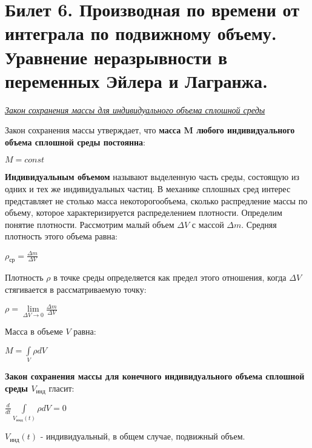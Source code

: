 \newpage
\section{Билет 6. Производная по времени от интеграла по подвижному объему. Уравнение неразрывности в переменных Эйлера и Лагранжа.}
\begin{center}
    \textit{\underline{Закон сохранения массы для индивидуального объема сплошной среды}}
\end{center}

Закон сохранения массы утверждает, что \textbf{масса M любого индивидуального объема сплошной среды постоянна}:
\begin{center}$
M = const
$\end{center}
\textbf{Индивидуальным объемом} называют выделенную часть среды, состоящую из одних и тех же индивидуальных частиц. В механике сплошных сред интерес представляет не столько масса некоторогообъема, сколько распредление массы по объему, которое характеризируется распределением плотности. Определим понятие плотности. Рассмотрим малый объем $\Delta {V}$ с массой $\Delta m$. Средняя плотность этого объема равна:
\begin{center}$
\rho_{ср} = \frac{\Delta m}{\Delta V}
$\end{center}

Плотность $\rho$ в точке среды определяется как предел этого отношения, когда $\Delta V$ стягивается в рассматриваемую точку:
\begin{center}$
\rho = \lim\limits_{\Delta V \to 0} \frac{\Delta m}{\Delta V}
$\end{center}

Масса в объеме $V$ равна:
\begin{center}$
M = \int\limits_V \rho dV
$\end{center}

\textbf{Закон сохранения массы для конечного индивидуального объема сплошной среды $V_{инд}$} гласит:
\begin{center}$
\frac{d}{dt} \int\limits_{V_{инд}(t)} \rho dV = 0
$\end{center}

$V_{инд}(t)$ - индивидуальный, в общем случае, подвижный объем.

